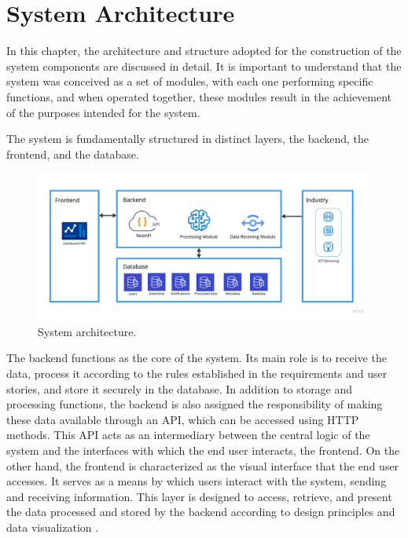 \chapter{System Architecture}\label{cap:development}
In this chapter, the architecture and structure adopted for the construction of the system components are discussed in detail. It is important to understand that the system was conceived as a set of modules, with each one performing specific functions, and when operated together, these modules result in the achievement of the purposes intended for the system.

The system is fundamentally structured in distinct layers, the backend, the frontend, and the database.

\begin{figure}[htbp]
	\centering
	\includegraphics[width=\textwidth]{images/Architecture.jpg}
	\caption{System architecture.}
	\label{fig:systemAchitectureImage}
\end{figure}

The backend functions as the core of the system. Its main role is to receive the data, process it according to the rules established in the requirements and user stories, and store it securely in the database. In addition to storage and processing functions, the backend is also assigned the responsibility of making these data available through an \gls{API}, which can be accessed using \gls{HTTP} methods. This \gls{API} acts as an intermediary between the central logic of the system and the interfaces with which the end user interacts, the frontend.
On the other hand, the frontend is characterized as the visual interface that the end user accesses. It serves as a means by which users interact with the system, sending and receiving information. This layer is designed to access, retrieve, and present the data processed and stored by the backend according to design principles and data visualization \cite{barbosa2019introduction}.

